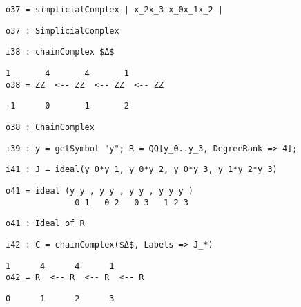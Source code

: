 \documentclass[12pt,leqno]{amsart}
\theoremstyle{definition}
\begin{document}
\begin{lstlisting}[xleftmargin=10pt, aboveskip=1.5pt, belowskip=1.5pt]
o37 = simplicialComplex | x_2x_3 x_0x_1x_2 |
\end{lstlisting}
\begin{lstlisting}[xleftmargin=10pt, aboveskip=1.5pt, belowskip=1.5pt]
o37 : SimplicialComplex
\end{lstlisting}
\begin{lstlisting}[xleftmargin=10pt, aboveskip=1.5pt, belowskip=1.5pt]
i38 : chainComplex $Δ$
\end{lstlisting}
\begin{lstlisting}[xleftmargin=10pt, lineskip=-10pt, aboveskip=1.5pt, belowskip=1.5pt]
        1       4       4       1
o38 = ZZ  <-- ZZ  <-- ZZ  <-- ZZ
\end{lstlisting}
\begin{lstlisting}[xleftmargin=10pt, aboveskip=1.5pt, belowskip=1.5pt]
      -1      0       1       2
\end{lstlisting}
\begin{lstlisting}[xleftmargin=10pt, aboveskip=1.5pt, belowskip=1.5pt]
o38 : ChainComplex
\end{lstlisting}
\begin{lstlisting}[xleftmargin=10pt, aboveskip=1.5pt, belowskip=1.5pt]
i39 : y = getSymbol "y"; R = QQ[y_0..y_3, DegreeRank => 4];
\end{lstlisting}
\begin{lstlisting}[xleftmargin=10pt, aboveskip=1.5pt, belowskip=1.5pt]
i41 : J = ideal(y_0*y_1, y_0*y_2, y_0*y_3, y_1*y_2*y_3)
\end{lstlisting}
\begin{lstlisting}[xleftmargin=10pt, lineskip=-10pt, aboveskip=1.5pt, belowskip=1.5pt]
o41 = ideal (y y , y y , y y , y y y )
              0 1   0 2   0 3   1 2 3
\end{lstlisting}
\begin{lstlisting}[xleftmargin=10pt, aboveskip=1.5pt, belowskip=1.5pt]
o41 : Ideal of R
\end{lstlisting}
\begin{lstlisting}[xleftmargin=10pt, aboveskip=1.5pt, belowskip=1.5pt]
i42 : C = chainComplex($Δ$, Labels => J_*)
\end{lstlisting}
\begin{lstlisting}[xleftmargin=10pt, lineskip=-10pt, aboveskip=1.5pt, belowskip=1.5pt]
       1      4      4      1
o42 = R  <-- R  <-- R  <-- R
\end{lstlisting}
\begin{lstlisting}[xleftmargin=10pt, aboveskip=1.5pt, belowskip=1.5pt]                           
      0      1      2      3
\end{lstlisting}
\end{document}

